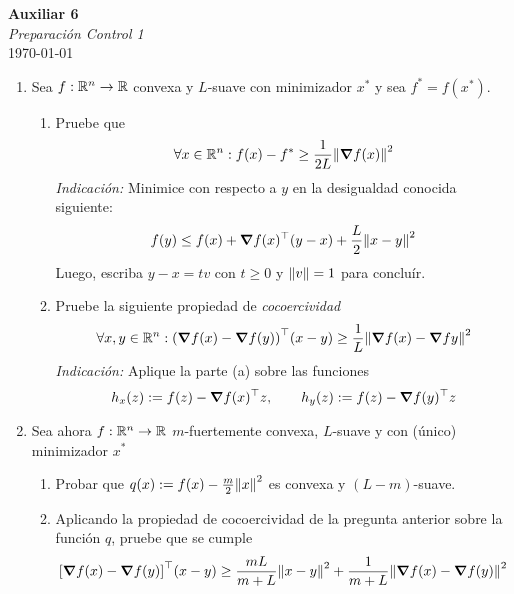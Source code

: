 \documentclass{article}
\begin{document}


\begin{center}
    \Huge{\textbf{Auxiliar 6}}\\
\textit{\large{Preparación Control 1}}\\
    \normalsize
	\today
\end{center}

\begin{enumerate}
	\item Sea \(f: \mathbb{R}^n \to \mathbb{R}\) convexa y \(L\)-suave con minimizador \(x^*\) y sea \(f^* = f(x^*)\).
		\begin{enumerate}
			\item Pruebe que
				\[\forall x \in \mathbb{R}^n : f(x) - f^* \geq \frac{1}{2L} \norm{\grad f(x)}^2\]
				\textit{Indicación:} Minimice con respecto a \(y\) en la desigualdad conocida siguiente:
				\[f(y) \leq f(x) + \grad f(x)^\top (y - x) + \frac{L}{2} \norm{x-y}^2\]
				Luego, escriba \(y - x = tv\) con \(t \geq 0\) y \(\norm{v} = 1\) para concluír.
			\item Pruebe la siguiente propiedad de \textit{cocoercividad}
				\[\forall x, y \in \mathbb{R}^n : \qty(\grad f(x) - \grad f(y))^\top (x - y) \geq \frac{1}{L} \norm{\grad f(x) - \grad f{y}}^2\]
				\textit{Indicación:} Aplique la parte (a) sobre las funciones
				\[h_x(z) := f(z) - \grad f(x)^\top z, \qquad h_y(z) := f(z) - \grad f (y) ^\top z\]
		\end{enumerate}
	\item Sea ahora \(f: \mathbb{R}^n \to \mathbb{R}\) \(m\)-fuertemente convexa, \(L\)-suave y con (único) minimizador \(x^*\)
		\begin{enumerate}
			\item Probar que \(q(x) := f(x) - \frac{m}{2} \norm{x}^2\) es convexa y \((L - m)\)-suave.
			\item Aplicando la propiedad de cocoercividad de la pregunta anterior sobre la función \(q\), pruebe que se cumple
				\[\qty[\grad f(x) - \grad f(y)]^\top (x - y) \geq \frac{mL}{m+L} \norm{x - y}^2 + \frac{1}{m+L} \norm{\grad f(x) - \grad f(y)}^2\]
		\end{enumerate}
\end{enumerate}
\end{document}
